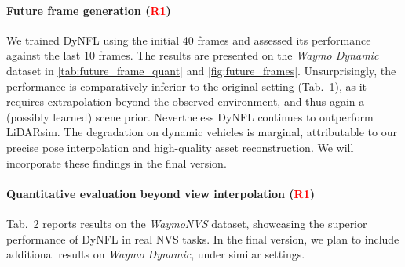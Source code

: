 \documentclass[10pt,twocolumn,letterpaper]{article}
\newcommand{\ROne}{{\textcolor{red}{\textbf{R1}}}}
\begin{document}
\paragraph{Future frame generation (\ROne)}
We trained DyNFL using the initial 40 frames and assessed its performance against the last 10 frames. The results are presented on the \textit{Waymo Dynamic} dataset in \cref{tab:future_frame_quant} and \cref{fig:future_frames}. Unsurprisingly, the performance is comparatively inferior to the original setting (\cf Tab.~1), as it requires extrapolation beyond the observed environment, and thus again a (possibly learned) scene prior. Nevertheless DyNFL continues to outperform LiDARsim. The degradation on dynamic vehicles is marginal, attributable to our precise pose interpolation and high-quality asset reconstruction. We will incorporate these findings in the final version.


\paragraph{Quantitative evaluation beyond view interpolation (\ROne)}
Tab.~2 reports results on the \textit{WaymoNVS} dataset, showcasing the superior performance of DyNFL in real NVS tasks. In the final version, we plan to include additional results on \textit{Waymo Dynamic}, under similar settings.
\end{document}
